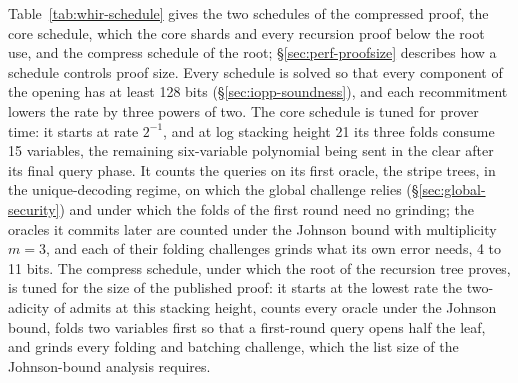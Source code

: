 Table~\ref{tab:whir-schedule} gives the two schedules of the compressed proof, the core schedule, which the core shards and every recursion proof below the root use, and the compress schedule of the root; \S\ref{sec:perf-proofsize} describes how a schedule controls proof size. Every schedule is solved so that every component of the opening has at least 128 bits (\S\ref{sec:iopp-soundness}), and each recommitment lowers the rate by three powers of two. The core schedule is tuned for prover time: it starts at rate $2^{-1}$, and at log stacking height 21 its three folds consume 15 variables, the remaining six-variable polynomial being sent in the clear after its final query phase. It counts the queries on its first oracle, the stripe trees, in the unique-decoding regime, on which the global challenge relies (\S\ref{sec:global-security}) and under which the folds of the first round need no grinding; the oracles it commits later are counted under the Johnson bound with multiplicity $m = 3$, and each of their folding challenges grinds what its own error needs, 4 to 11 bits. The compress schedule, under which the root of the recursion tree proves, is tuned for the size of the published proof: it starts at the lowest rate the two-adicity of \KB{} admits at this stacking height, counts every oracle under the Johnson bound, folds two variables first so that a first-round query opens half the leaf, and grinds every folding and batching challenge, which the list size of the Johnson-bound analysis requires.

\begin{table}[t]
\centering
\small
\caption{The core and compress Jagged--\WHIR{} schedules; the core schedule also proves every recursion node below the root. Analysis is the regime queries are counted in. Queries are per committed round, followed by the final query phase. OOD entries count samples after committed folds; the fold grind is the range over the folding challenges of the rounds that grind them, each ground what its own error needs. The stripe bound covers both ordered input-commitment rounds.}
\label{tab:whir-schedule}
\end{table}

